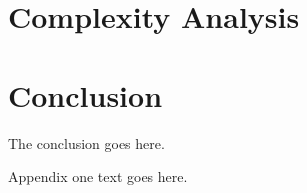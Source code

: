 \documentclass[12pt, draftclsnofoot, onecolumn]{IEEEtran}
\begin{document}
\begin{spacing}{2}
\section{Complexity Analysis}


\section{Conclusion}
The conclusion goes here.






%


\appendices
Appendix one text goes here.


\end{spacing}
\end{document}
